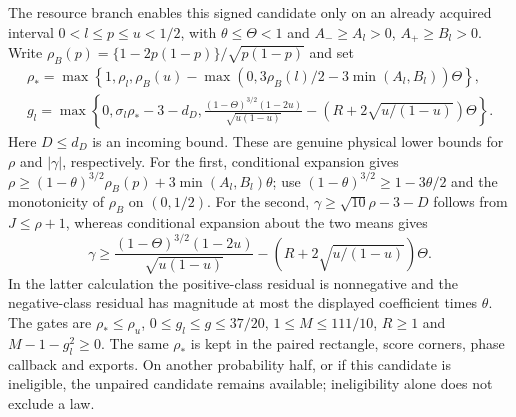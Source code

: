 \documentclass[aop,preprint]{imsart}
\theoremstyle{definition}
\numberwithin{equation}{section}
\begin{document}
The resource branch enables this signed candidate only on an already
acquired interval $0<l\le p\le u<1/2$, with $\theta\le\Theta<1$
and $A_-\ge A_l>0$, $A_+\ge B_l>0$.
Write $\rho_B(p)=\{1-2p(1-p)\}/\sqrt{p(1-p)}$ and set
\begin{gather*}
 \rho_* =\max\left\{1,\rho_l,\rho_B(u)
       -\max(0,3\rho_B(l)/2-3\min(A_l,B_l))\Theta\right\},\\
 g_l=\max\left\{0,\sigma_l\rho_*-3-d_D,
 \frac{(1-\Theta)^{3/2}(1-2u)}{\sqrt{u(1-u)}}
                -(R+2\sqrt{u/(1-u)})\Theta\right\}.
\end{gather*}
Here $D\le d_D$ is an incoming bound. These are genuine physical
lower bounds for $\rho$ and $|\gamma|$, respectively.
For the first, conditional expansion gives
$\rho\ge(1-\theta)^{3/2}\rho_B(p)+3\min(A_l,B_l)\theta$;
use $(1-\theta)^{3/2}\ge1-3\theta/2$ and the monotonicity of
$\rho_B$ on $(0,1/2)$.
For the second, $\gamma\ge\sqrt{10}\rho-3-D$ follows from
$J\le\rho+1$, whereas conditional expansion about the two means gives
\[
 \gamma\ge\frac{(1-\Theta)^{3/2}(1-2u)}{\sqrt{u(1-u)}}
                     -(R+2\sqrt{u/(1-u)})\Theta.
\]
In the latter calculation the positive-class residual is nonnegative
and the negative-class residual has magnitude at most the displayed
coefficient times $\theta$.
The gates are $\rho_*\le\rho_u$, $0\le g_l\le g\le37/20$,
$1\le M\le111/10$, $R\ge1$ and $M-1-g_l^2\ge0$.
The same $\rho_*$ is kept in the paired rectangle, score corners,
phase callback and exports. On another probability half, or if this
candidate is ineligible, the unpaired candidate remains available;
ineligibility alone does not exclude a law.
\end{document}

